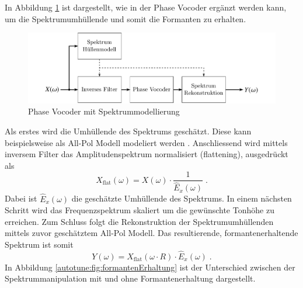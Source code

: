 In Abbildung \ref{autotune:fig:pitchShiftingSpektrumModellierung} ist dargestellt, wie in der Phase Vocoder ergänzt werden kann,
um die Spektrumumhüllende und somit die Formanten zu erhalten.
\begin{figure}
    \centering
    \includegraphics[width=\textwidth]{papers/autotune/images/Spektrum-Modellierung.pdf}
    \caption{Phase Vocoder mit Spektrummodellierung}
    \label{autotune:fig:pitchShiftingSpektrumModellierung}
\end{figure}
Als erstes wird die Umhüllende des Spektrums geschätzt.
Diese kann beispielsweise als All-Pol Modell modeliert werden \cite{autotune:allPollEstimationOfVocalTract}.
Anschliessend wird mittels inversem Filter das Amplitudenspektrum normalisiert (flattening), ausgedrückt als
\begin{equation}
    X_{\text{flat}}(\omega)
    =
    X(\omega) \cdot \frac{1}{\hat{E}_x(\omega)} \;.
\end{equation}
Dabei ist $\hat{E}_x(\omega)$ die geschätzte Umhüllende des Spektrums.
In einem nächsten Schritt wird das Frequenzspektrum skaliert um die gewünschte Tonhöhe zu erreichen.
Zum Schluss folgt die Rekonstruktion der Spektrumumhüllenden mittels zuvor geschätztem All-Pol Modell.
Das resultierende, formantenerhaltende Spektrum ist somit
\begin{equation}
    Y(\omega)
    =
    X_{\text{flat}}(\omega \cdot R) \cdot \hat{E}_x(\omega) \;.
\end{equation}
In Abbildung \ref{autotune:fig:formantenErhaltung} ist der Unterschied zwischen der Spektrummanipulation mit und ohne Formantenerhaltung dargestellt.
